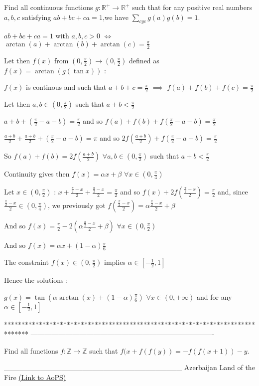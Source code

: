 \begin{solution}
	\begin{tcolorbox}Find all continuous functions $g:\mathbb{R^{+}}\rightarrow\mathbb{R^{+}}$ such that for any
positive real numbers $a,b,c$ satisfying $ab+bc+ca=1$,we have $\sum_{cyc}g(a)g(b)=1$.\end{tcolorbox}
$ab+bc+ca=1$ with $a,b,c>0$ $\iff$ $\arctan(a)+\arctan(b)+\arctan(c)=\frac{\pi}2$

Let then $f(x)$ from $(0,\frac{\pi}2)\to(0,\frac{\pi}2)$ defined as $f(x)=\arctan(g(\tan x))$ :

$f(x)$ is continous and such that $a+b+c=\frac{\pi}2$ $\implies$ $f(a)+f(b)+f(c)=\frac{\pi}2$

Let then $a,b\in(0,\frac{\pi}2)$ such that $a+b<\frac{\pi}2$

$a+b+(\frac{\pi}2-a-b)=\frac{\pi}2$ and so $f(a)+f(b)+f(\frac{\pi}2-a-b)=\frac{\pi}2$

$\frac{a+b}2+\frac{a+b}2+(\frac{\pi}2-a-b)=\pi$ and so $2f(\frac{a+b}2)+f(\frac{\pi}2-a-b)=\frac{\pi}2$

So $f(a)+f(b)=2f(\frac{a+b}2)$ $\forall a,b\in(0,\frac{\pi}2)$ such that $a+b<\frac{\pi}2$

Continuity gives then $f(x)=\alpha x+\beta$ $\forall x\in(0,\frac{\pi}4)$

Let $x\in(0,\frac{\pi}2)$ : $x+\frac{\frac{\pi}2-x}2+\frac{\frac{\pi}2-x}2=\frac{\pi}2$ and so $f(x)+2f(\frac{\frac{\pi}2-x}2)=\frac{\pi}2$ and, since $\frac{\frac{\pi}2-x}2\in(0,\frac{\pi}4)$, we previously got $f(\frac{\frac{\pi}2-x}2)=\alpha\frac{\frac{\pi}2-x}2+\beta$

And so $f(x)=\frac{\pi}2-2(\alpha\frac{\frac{\pi}2-x}2+\beta)$ $\forall x\in(0,\frac{\pi}2)$

And so $f(x)=\alpha x+(1-\alpha)\frac{\pi}6$

The constraint $f(x)\in(0,\frac{\pi}2)$ implies $\alpha\in[-\frac 12,1]$

Hence the solutions : 

$\boxed{g(x)=\tan(\alpha \arctan(x)+(1-\alpha)\frac{\pi}6)}$ $\forall x\in(0,+\infty)$  and for any $\alpha\in[-\frac 12,1]$
\end{solution}
*******************************************************************************
-------------------------------------------------------------------------------

\begin{problem}
	Find all functions $f: \mathbb{Z}\to\mathbb{Z}$ such that $f(x+f(f(y))=-f(f(x+1))-y$.


__________________________________
Azerbaijan Land of the Fire 
	\flushright \href{https://artofproblemsolving.com/community/c6h477422}{(Link to AoPS)}
\end{problem}



